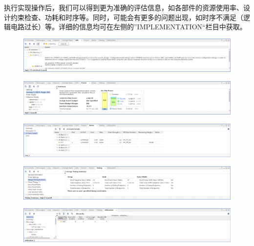 \documentclass{ctexart}
\begin{document}
执行实现操作后，我们可以得到更为准确的评估信息，如各部件的资源使用率、设计约束检查、功耗和时序等。同时，可能会有更多的问题出现，如时序不满足（逻辑电路过长）等。详细的信息均可在左侧的”IMPLEMENTATION“栏目中获取。

\begin{figure}[H]
    \centering
    \includegraphics[width=\textwidth]{lab0/30.png}
\end{figure}

\begin{figure}[H]
    \centering
    \includegraphics[width=\textwidth]{lab0/31.png}
\end{figure}

\begin{figure}[H]
    \centering
    \includegraphics[width=\textwidth]{lab0/32.png}
\end{figure}

\begin{figure}[H]
    \centering
    \includegraphics[width=\textwidth]{lab0/33.png}
\end{figure}

\begin{figure}[H]
    \centering
    \includegraphics[width=\textwidth]{lab0/34.png}
\end{figure}
\end{document}

